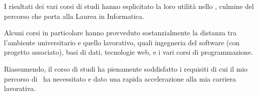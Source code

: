 I risultati dei vari corsi di studi hanno esplicitato la loro utilità nello \stage, culmine del percorso che porta alla Laurea in Informatica.

Alcuni corsi in particolare hanno provveduto sostanzialmente la distanza tra l'ambiente universitario e quello lavorativo, quali ingegneria del software (con progetto associato), basi di dati, tecnologie web, e i vari corsi di programmazione.

Riassumendo, il corso di studi ha pienamente soddisfatto i requisiti di cui il mio percorso di \stage\ ha necessitato e dato una rapida accelerazione alla mia carriera lavorativa.
